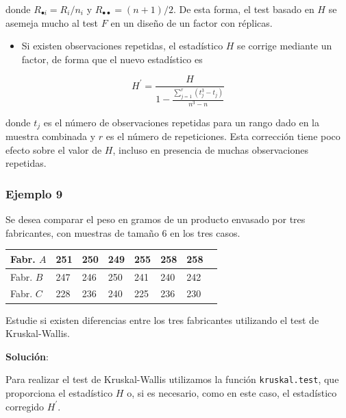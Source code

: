 \documentclass[
]{article}
\providecommand{\tightlist}{%
  \setlength{\itemsep}{0pt}\setlength{\parskip}{0pt}}
\begin{document}
donde \(R_{\bullet i}=R_{i} / n_{i}\) y \(R_{\bullet \bullet}=(n+1) / 2\). De esta forma, el test basado en \(H\) se asemeja mucho al test \(F\) en un diseño de un factor con réplicas.

\begin{itemize}
\tightlist
\item
  Si existen observaciones repetidas, el estadístico \(H\) se corrige mediante un factor, de forma que el nuevo estadístico es
\end{itemize}

\[
H^{\prime}=\frac{H}{1-\frac{\sum_{j=1}^{r}\left(t_{j}^{3}-t_{j}\right)}{n^{3}-n}}
\]

donde \(t_{j}\) es el número de observaciones repetidas para un rango dado en la muestra combinada y \(r\) es el número de repeticiones. Esta corrección tiene poco efecto sobre el valor de \(H\), incluso en presencia de muchas observaciones repetidas.

\subsubsection{Ejemplo 9}\label{ejemplo-9-1}

Se desea comparar el peso en gramos de un producto envasado por tres fabricantes, con muestras de tamaño 6 en los tres casos.

\begin{longtable}[]{@{}llllllll@{}}
\toprule\noalign{}
Fabr. \(A\) & 251 & 250 & 249 & 255 & 258 & 258 & \\
\midrule\noalign{}
\endhead
\bottomrule\noalign{}
\endlastfoot
Fabr. \(B\) & 247 & 246 & 250 & 241 & 240 & 242 & \\
Fabr. \(C\) & 228 & 236 & 240 & 225 & 236 & 230 & \\
\end{longtable}

Estudie si existen diferencias entre los tres fabricantes utilizando el test de Kruskal-Wallis.

\textbf{Solución}:

Para realizar el test de Kruskal-Wallis utilizamos la función \texttt{kruskal.test}, que proporciona el estadístico \(H\) o, si es necesario, como en este caso, el estadístico corregido \(H^{\prime}\).
\end{document}
